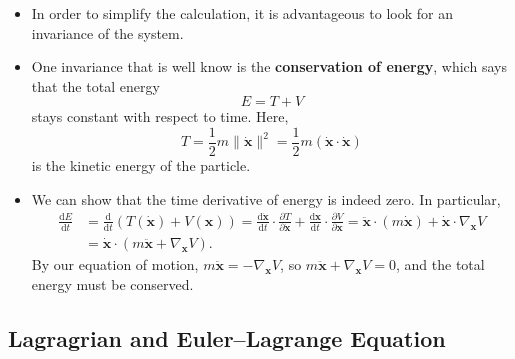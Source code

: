 \documentclass[10pt]{article}
\newcommand{\dee}{\mathrm{d}}
\newcommand{\ve}[1]{\mathbf{#1}}
\begin{document}
\begin{itemize}
  	\item In order to simplify the calculation, it is advantageous to look for an invariance of the system.

  	\item One invariance that is well know is the {\bf conservation of energy}, which says that the total energy $$E = T + V$$ stays constant with respect to time. Here, $$T = \frac{1}{2} m \| \dot{\ve{x}} \|^2 = \frac{1}{2} m (\dot{\ve{x}} \cdot \dot{\ve{x}})$$ is the kinetic energy of the particle.

  	\item We can show that the time derivative of energy is indeed zero. In particular,
  	\begin{align*}
  		\frac{\dee E}{\dee t}
  		&= \frac{\dee}{\dee t} (T(\dot{\ve{x}}) + V(\ve{x}))
  		= \frac{\dee \dot{\ve{x}}}{\dee t} \cdot \frac{\partial T}{\partial \dot{\ve{x}}} + \frac{\dee\ve{x}}{\dee t} \cdot \frac{\partial V}{\partial \ve{x}}
  		= \ddot{\ve{x}} \cdot (m\dot{\ve{x}}) + \dot{\ve{x}} \cdot \nabla_{\ve{x}} V \\
  		&= \dot{\ve{x}} \cdot (m\ddot{\ve{x}} + \nabla_{\ve{x}} V).
  	\end{align*}
  	By our equation of motion, $m\ddot{\ve{x}} = - \nabla_{\ve{x}} V$, so $m\ddot{\ve{x}} + \nabla_{\ve{x}} V = 0$, and the total energy must be conserved.
  \end{itemize}

  \subsection{Lagragrian and Euler--Lagrange Equation}
\end{document}
